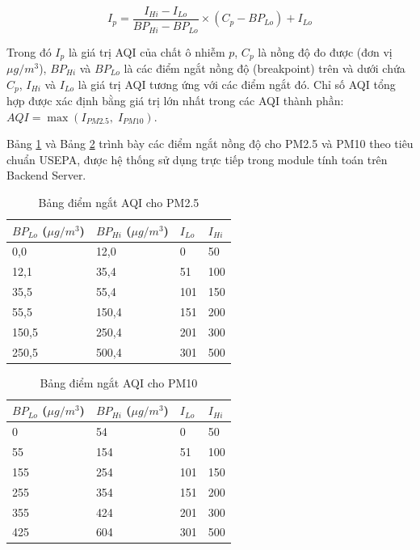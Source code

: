 \documentclass[../DoAn.tex]{subfiles}
\begin{document}
\begin{equation}
\label{eq:aqi}
I_p = \frac{I_{Hi} - I_{Lo}}{BP_{Hi} - BP_{Lo}} \times (C_p - BP_{Lo}) + I_{Lo}
\end{equation}

Trong đó $I_p$ là giá trị \gls{AQI} của chất ô nhiễm $p$, $C_p$ là nồng độ đo được (đơn vị $\mu g/m^3$), $BP_{Hi}$ và $BP_{Lo}$ là các điểm ngắt nồng độ (breakpoint) trên và dưới chứa $C_p$, $I_{Hi}$ và $I_{Lo}$ là giá trị \gls{AQI} tương ứng với các điểm ngắt đó. Chỉ số \gls{AQI} tổng hợp được xác định bằng giá trị lớn nhất trong các \gls{AQI} thành phần: $AQI = \max(I_{PM2.5},\; I_{PM10})$.

Bảng \ref{table:bp_pm25} và Bảng \ref{table:bp_pm10} trình bày các điểm ngắt nồng độ cho PM2.5 và PM10 theo tiêu chuẩn \gls{USEPA}, được hệ thống sử dụng trực tiếp trong module tính toán trên Backend Server.

\begin{table}[H]
\centering
\caption{Bảng điểm ngắt AQI cho PM2.5 \cite{usepa2018}}
\label{table:bp_pm25}
\small
\begin{tabularx}{\textwidth}{|X|X|X|X|}
\hline
\textbf{$BP_{Lo}$ ($\mu g/m^3$)} & \textbf{$BP_{Hi}$ ($\mu g/m^3$)} & \textbf{$I_{Lo}$} & \textbf{$I_{Hi}$} \\
\hline
0,0 & 12,0 & 0 & 50 \\
\hline
12,1 & 35,4 & 51 & 100 \\
\hline
35,5 & 55,4 & 101 & 150 \\
\hline
55,5 & 150,4 & 151 & 200 \\
\hline
150,5 & 250,4 & 201 & 300 \\
\hline
250,5 & 500,4 & 301 & 500 \\
\hline
\end{tabularx}
\end{table}

\begin{table}[H]
\centering
\caption{Bảng điểm ngắt AQI cho PM10 \cite{usepa2018}}
\label{table:bp_pm10}
\small
\begin{tabularx}{\textwidth}{|X|X|X|X|}
\hline
\textbf{$BP_{Lo}$ ($\mu g/m^3$)} & \textbf{$BP_{Hi}$ ($\mu g/m^3$)} & \textbf{$I_{Lo}$} & \textbf{$I_{Hi}$} \\
\hline
0 & 54 & 0 & 50 \\
\hline
55 & 154 & 51 & 100 \\
\hline
155 & 254 & 101 & 150 \\
\hline
255 & 354 & 151 & 200 \\
\hline
355 & 424 & 201 & 300 \\
\hline
425 & 604 & 301 & 500 \\
\hline
\end{tabularx}
\end{table}
\end{document}
